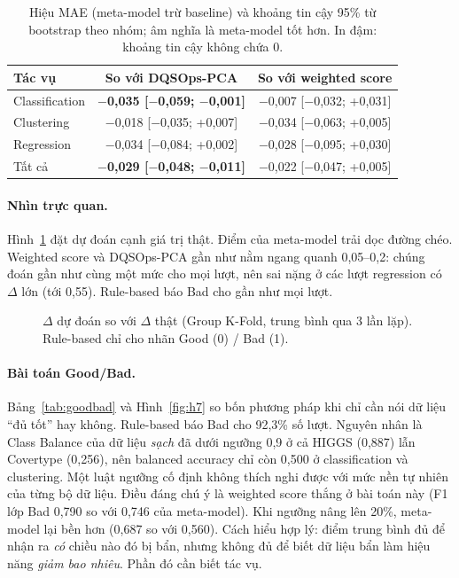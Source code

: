 \begin{table}[ht]
\centering
\small
\begin{tabular}{@{}lcc@{}}
\toprule
Tác vụ & So với DQSOps-PCA & So với weighted score \\
\midrule
Classification & \textbf{$-$0,035 [$-$0,059; $-$0,001]} & $-$0,007 [$-$0,032; +0,031] \\
Clustering  & $-$0,018 [$-$0,035; +0,007] & $-$0,034 [$-$0,063; +0,005] \\
Regression   & $-$0,034 [$-$0,084; +0,002] & $-$0,028 [$-$0,095; +0,030] \\
Tất cả    & \textbf{$-$0,029 [$-$0,048; $-$0,011]} & $-$0,022 [$-$0,047; +0,005] \\
\bottomrule
\end{tabular}
\caption{Hiệu MAE (meta-model trừ baseline) và khoảng tin cậy 95\% từ bootstrap theo nhóm; âm nghĩa là meta-model tốt hơn. In đậm: khoảng tin cậy không chứa 0.}
\label{tab:bootstrap}
\end{table}

\paragraph{Nhìn trực quan.} Hình~\ref{fig:h6} đặt dự đoán cạnh giá trị thật. Điểm của meta-model trải dọc đường chéo. Weighted score và DQSOps-PCA gần như nằm ngang quanh 0,05--0,2: chúng đoán gần như cùng một mức cho mọi lượt, nên sai nặng ở các lượt regression có $\Delta$ lớn (tới 0,55). Rule-based báo Bad cho gần như mọi lượt.

\begin{figure}[ht]
\centering
{}
\caption{$\Delta$ dự đoán so với $\Delta$ thật (Group K-Fold, trung bình qua 3 lần lặp). Rule-based chỉ cho nhãn Good (0) / Bad (1).}
\label{fig:h6}
\end{figure}

\paragraph{Bài toán Good/Bad.} Bảng~\ref{tab:goodbad} và Hình~\ref{fig:h7} so bốn phương pháp khi chỉ cần nói dữ liệu ``đủ tốt'' hay không. Rule-based báo Bad cho 92,3\% số lượt. Nguyên nhân là Class Balance của dữ liệu \emph{sạch} đã dưới ngưỡng 0,9 ở cả HIGGS (0,887) lẫn Covertype (0,256), nên balanced accuracy chỉ còn 0,500 ở classification và clustering. Một luật ngưỡng cố định không thích nghi được với mức nền tự nhiên của từng bộ dữ liệu. Điều đáng chú ý là weighted score thắng ở bài toán này (F1 lớp Bad 0,790 so với 0,746 của meta-model). Khi ngưỡng nâng lên 20\%, meta-model lại bền hơn (0,687 so với 0,560). Cách hiểu hợp lý: điểm trung bình đủ để nhận ra \emph{có} chiều nào đó bị bẩn, nhưng không đủ để biết dữ liệu bẩn làm hiệu năng \emph{giảm bao nhiêu}. Phần đó cần biết tác vụ.

